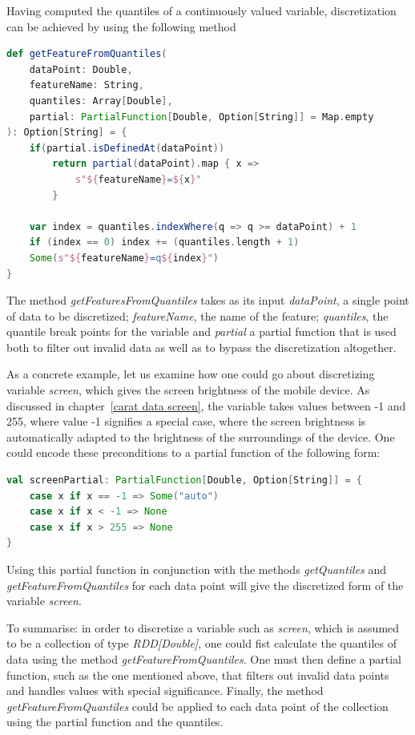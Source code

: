 Having computed the quantiles of a continuously valued variable, discretization can be achieved by using the following method

\begin{minipage}{\linewidth}
\begin{lstlisting}[language=scala] 
def getFeatureFromQuantiles(
	dataPoint: Double,
	featureName: String,
	quantiles: Array[Double],
	partial: PartialFunction[Double, Option[String]] = Map.empty
): Option[String] = {
	if(partial.isDefinedAt(dataPoint))
		return partial(dataPoint).map { x => 
			s"${featureName}=${x}"
		}
	
	var index = quantiles.indexWhere(q => q >= dataPoint) + 1	
	if (index == 0) index += (quantiles.length + 1)
	Some(s"${featureName}=q${index}")
}  
\end{lstlisting}
\end{minipage}  

The method \textit{getFeaturesFromQuantiles} takes as its input \textit{dataPoint}, a single point of data to be discretized; \textit{featureName}, the name of the feature; \textit{quantiles}, the quantile break points for the variable and \textit{partial} a partial function that is used both to filter out invalid data as well as to bypass the discretization altogether.

As a concrete example, let us examine how one could go about discretizing variable \textit{screen}, which gives the screen brightness of the mobile device. As discussed in chapter~\ref{carat data screen}, the variable takes values between -1 and 255, where value -1 signifies a special case, where the screen brightness is automatically adapted to the brightness of the surroundings of the device. One could encode these preconditions to a partial function of the following form:
\begin{minipage}{\linewidth}
\begin{lstlisting}[language=scala] 
val screenPartial: PartialFunction[Double, Option[String]] = {
    case x if x == -1 => Some("auto")
    case x if x < -1 => None
	case x if x > 255 => None
}
\end{lstlisting}
\end{minipage} 
Using this partial function in conjunction with the methods \textit{getQuantiles} and \textit{getFeatureFromQuantiles} for each data point will give the discretized form of the variable \textit{screen}. 

To summarise: in order to discretize a variable such as \textit{screen}, which is assumed to be a collection of type \textit{RDD[Double]}, one could fist calculate the quantiles of data using the method \textit{getFeatureFromQuantiles}. One must then define a partial function, such as the one mentioned above, that filters out invalid data points and handles values with special significance. Finally, the method \textit{getFeatureFromQuantiles} could be applied to each data point of the collection using the partial function and the quantiles.

